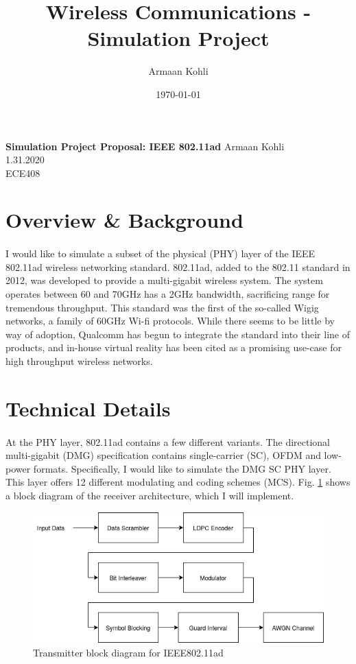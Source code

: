 \documentclass[justified,nobib]{tufte-handout}
\title{Wireless Communications - Simulation Project}
\author{Armaan Kohli}
\date{\today}
\begin{document}
\begin{fullwidth}
{
  \noindent\fontsize{12pt}{20pt}\selectfont\textbf{Simulation Project Proposal: IEEE 802.11ad}
  \newline
  \fontsize{12pt}{18pt}\selectfont
  {Armaan Kohli}\\
  {1.31.2020} \\
  {ECE408}
}
\raggedright
\raggedbottom


\section{Overview \& Background}
\paragraph{}
I would like to simulate a subset of the physical (PHY) layer of the IEEE 802.11ad wireless networking standard. 802.11ad, added to the 802.11 standard in 2012, was developed to provide a multi-gigabit wireless system. The system operates between 60 and 70GHz has a 2GHz bandwidth, sacrificing range for tremendous throughput. This standard was the first of the so-called Wigig networks, a family of 60GHz Wi-fi protocols. While there seems to be little by way of adoption, Qualcomm has begun to integrate the standard into their line of products, and in-house virtual reality has been cited as a promising use-case for high throughput wireless networks.

\section{Technical Details}
\paragraph{} At the PHY layer, 802.11ad contains a few different variants. The directional multi-gigabit (DMG) specification contains single-carrier (SC), OFDM and low-power formats. Specifically, I would like to simulate the DMG SC PHY layer. This layer offers 12 different modulating and coding schemes (MCS). Fig. \ref{phy} shows a block diagram of the receiver architecture, which I will implement. 
\begin{figure}[htp]
\includegraphics[scale=.5]{phy.png}
\caption{Transmitter block diagram for IEEE802.11ad}
\label{phy}
\end{figure}

\end{fullwidth}
\end{document}
